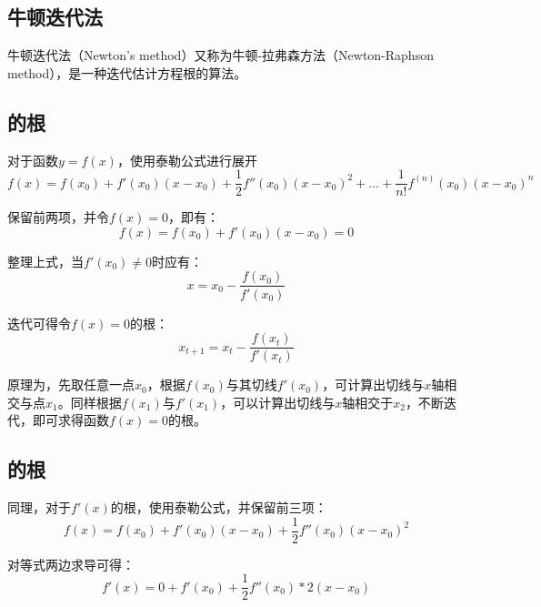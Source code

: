 \documentclass[11pt]{article}
\begin{document}
\begin{appendices}

\section{牛顿迭代法}

牛顿迭代法（Newton's method）又称为牛顿-拉弗森方法（Newton-Raphson method），是一种迭代估计方程根的算法。

\subsection{的根}

对于函数$y = f(x)$，使用泰勒公式进行展开
\begin{equation*}
    f(x) = f(x_0) + f'(x_0)(x-x_0) + \frac{1}{2}f''(x_0)(x-x_0)^2 + \dots + \frac{1}{n!}f^{(n)}(x_0)(x-x_0)^n
\end{equation*}

保留前两项，并令$f(x) = 0$，即有：
\begin{equation*}
    f(x) = f(x_0) + f'(x_0)(x-x_0) = 0
\end{equation*}

整理上式，当$f'(x_0) \neq 0$时应有：
\begin{equation*}
    x = x_0 - \frac{f(x_0)}{f'(x_0)}
\end{equation*}

迭代可得令$f(x) = 0$的根：
\begin{equation*}
    x_{t+1} = x_t - \frac{f(x_t)}{f'(x_t)}
\end{equation*}

\begin{remark}
    原理为，先取任意一点$x_0$，根据$f(x_0)$与其切线$f'(x_0)$，可计算出切线与$x$轴相交与点$x_1$。同样根据$f(x_1)$与$f'(x_1)$，可以计算出切线与$x$轴相交于$x_2$，不断迭代，即可求得函数$f(x)=0$的根。
\end{remark}

\subsection{的根}

同理，对于$f'(x)$的根，使用泰勒公式，并保留前三项：
\begin{equation*}
    f(x) = f(x_0) + f'(x_0)(x-x_0) + \frac{1}{2}f''(x_0)(x-x_0)^2
\end{equation*}

对等式两边求导可得：
\begin{equation*}
    f'(x) = 0 + f'(x_0) + \frac{1}{2}f''(x_0)*2(x-x_0)
\end{equation*}


\end{appendices}
\end{document}
